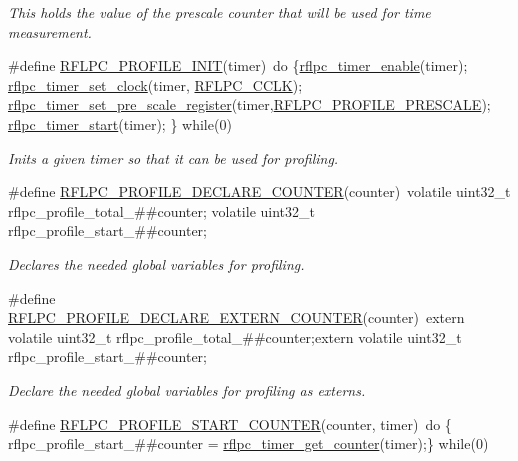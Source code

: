 \begin{DoxyCompactItemize}
\begin{DoxyCompactList}\small\item\em This holds the value of the prescale counter that will be used for time measurement. \end{DoxyCompactList}\item 
\#define \hyperlink{group__debug_ga140cad36269d6883574de7a6ebe1f219}{R\-F\-L\-P\-C\-\_\-\-P\-R\-O\-F\-I\-L\-E\-\_\-\-I\-N\-I\-T}(timer)~do \{\hyperlink{group__timer_gac3200d2da39f6c6975220c757fc51e18}{rflpc\-\_\-timer\-\_\-enable}(timer); \hyperlink{group__timer_gae9545ba61ff95f505f58f476e49af10b}{rflpc\-\_\-timer\-\_\-set\-\_\-clock}(timer, \hyperlink{group__clock_ggaf3b7fc561cd12dfdff9f7c1357c3f016a9cc79356f5343282b73a36bd7e6115ba}{R\-F\-L\-P\-C\-\_\-\-C\-C\-L\-K}); \hyperlink{group__timer_gacbcb64481ba2834f37c46629823a6b7e}{rflpc\-\_\-timer\-\_\-set\-\_\-pre\-\_\-scale\-\_\-register}(timer,\hyperlink{group__debug_gade638bd8e832b7cb23d79221bdd672b3}{R\-F\-L\-P\-C\-\_\-\-P\-R\-O\-F\-I\-L\-E\-\_\-\-P\-R\-E\-S\-C\-A\-L\-E}); \hyperlink{group__timer_gaba3c362b2682760af6b95bc5726ed8f9}{rflpc\-\_\-timer\-\_\-start}(timer); \} while(0)
\begin{DoxyCompactList}\small\item\em Inits a given timer so that it can be used for profiling. \end{DoxyCompactList}\item 
\#define \hyperlink{group__debug_gaf3dad1b7a2e3f333b1d176ec392127d8}{R\-F\-L\-P\-C\-\_\-\-P\-R\-O\-F\-I\-L\-E\-\_\-\-D\-E\-C\-L\-A\-R\-E\-\_\-\-C\-O\-U\-N\-T\-E\-R}(counter)~volatile uint32\-\_\-t rflpc\-\_\-profile\-\_\-total\-\_\-\#\#counter; volatile uint32\-\_\-t rflpc\-\_\-profile\-\_\-start\-\_\-\#\#counter;
\begin{DoxyCompactList}\small\item\em Declares the needed global variables for profiling. \end{DoxyCompactList}\item 
\#define \hyperlink{group__debug_ga80914dfeedd73b1ac4eedc24df91d4f5}{R\-F\-L\-P\-C\-\_\-\-P\-R\-O\-F\-I\-L\-E\-\_\-\-D\-E\-C\-L\-A\-R\-E\-\_\-\-E\-X\-T\-E\-R\-N\-\_\-\-C\-O\-U\-N\-T\-E\-R}(counter)~extern volatile uint32\-\_\-t rflpc\-\_\-profile\-\_\-total\-\_\-\#\#counter;extern volatile uint32\-\_\-t rflpc\-\_\-profile\-\_\-start\-\_\-\#\#counter;
\begin{DoxyCompactList}\small\item\em Declare the needed global variables for profiling as externs. \end{DoxyCompactList}\item 
\hypertarget{group__debug_ga820884ce2945c507ed1c87e431a54204}{\#define \hyperlink{group__debug_ga820884ce2945c507ed1c87e431a54204}{R\-F\-L\-P\-C\-\_\-\-P\-R\-O\-F\-I\-L\-E\-\_\-\-S\-T\-A\-R\-T\-\_\-\-C\-O\-U\-N\-T\-E\-R}(counter, timer)~do \{ rflpc\-\_\-profile\-\_\-start\-\_\-\#\#counter = \hyperlink{group__timer_ga57e24ccdcea66db465b16834b44b59a9}{rflpc\-\_\-timer\-\_\-get\-\_\-counter}(timer);\} while(0)}\label{group__debug_ga820884ce2945c507ed1c87e431a54204}


\end{DoxyCompactItemize}
